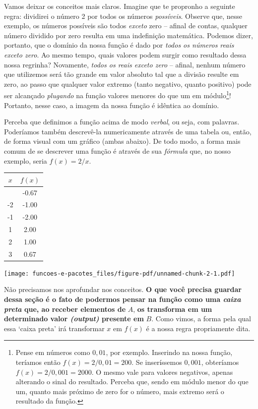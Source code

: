 \documentclass[
  letterpaper,
  DIV=11,
  numbers=noendperiod]{scrreprt}
\begin{document}
Vamos deixar os conceitos mais claros. Imagine que te propronho a
seguinte regra: dividirei o número 2 por todos os números
\emph{possíveis}. Observe que, nesse exemplo, os números possíveis são
todos \emph{exceto} zero -- afinal de contas, qualquer número dividido
por zero resulta em uma indefinição matemática. Podemos dizer, portanto,
que o domínio da nossa função é dado por \emph{todos os números reais
exceto zero}. Ao mesmo tempo, quais valores podem surgir como resultado
dessa nossa regrinha? Novamente, \emph{todos os reais exceto zero} --
afinal, nenhum número que utilizemos será tão grande em valor absoluto
tal que a divisão resulte em zero, ao passo que qualquer valor extremo
(tanto negativo, quanto positivo) pode ser alcançado \emph{plugando} na
função valores menores do que um em módulo\footnote{Pense em números
  como \(0,01\), por exemplo. Inserindo na nossa função, teríamos então
  \(f(x)=2/0,01=200\). Se inseríssemos \(0,001\), obteríamos
  \(f(x)=2/0,001=2000\). O mesmo vale para valores negativos, apenas
  alterando o sinal do resultado. Perceba que, sendo em módulo menor do
  que um, quanto mais próximo de zero for o número, mais extremo será o
  resultado da função.}! Portanto, nesse caso, a imagem da nossa função
é idêntica ao domínio.

Perceba que definimos a função acima de modo \emph{verbal}, ou seja, com
palavras. Poderíamos também descrevê-la numericamente através de uma
tabela ou, então, de forma visual com um gráfico (ambas abaixo). De todo
modo, a forma mais comum de se descrever uma função é através de sua
\emph{fórmula} que, no nosso exemplo, seria \(f(x)=2/x\).

\begin{longtable}[]{@{}cc@{}}
\toprule\noalign{}
\(x\) & \(f(x)\) \\
\midrule\noalign{}
\endhead
\bottomrule\noalign{}
\endlastfoot
-3 & -0.67 \\
-2 & -1.00 \\
-1 & -2.00 \\
1 & 2.00 \\
2 & 1.00 \\
3 & 0.67 \\
\end{longtable}

\texttt{[image: funcoes-e-pacotes\_files/figure-pdf/unnamed-chunk-2-1.pdf]}

Não precisamos nos aprofundar nos conceitos. \textbf{O que você precisa
guardar dessa seção é o fato de podermos pensar na função como uma
\emph{caixa preta} que, ao receber elementos de} \(A\), \textbf{os
transforma em um determinado valor \emph{(output)} presente em} \(B\).
Como vimos, a forma pela qual essa `caixa preta' irá transformar \(x\)
em \(f(x)\) é a nossa regra propriamente dita.
\end{document}
